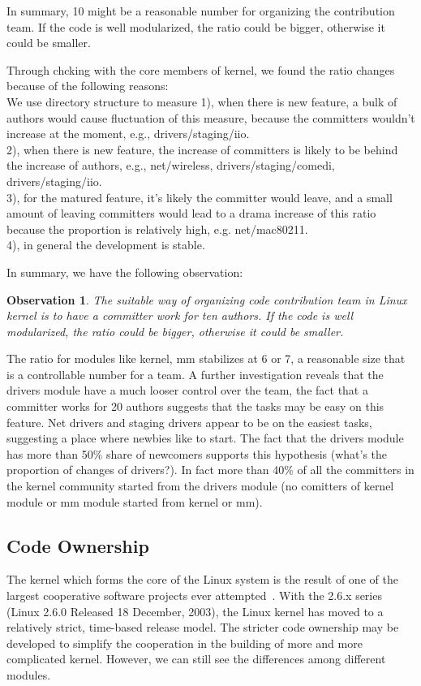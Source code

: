 \documentclass{sig-alternate-05-2015}
\newtheorem{observation}{\bf Observation}
\begin{document}
In summary, 10 might be a reasonable number for organizing the contribution
team. If the code is well modularized, the ratio could be bigger, otherwise
it could be smaller.

Through chcking with the core members of kernel, we found the ratio changes because of the following reasons: \\
We use directory structure to measure 
1), when there is new feature, a bulk of authors would cause fluctuation of this measure,
because the committers wouldn't increase at the moment, e.g., drivers/staging/iio. \\
2), when there is new feature, the increase of committers is likely to be behind
the increase of authors, e.g., net/wireless, drivers/staging/comedi, drivers/staging/iio.  \\
3), for the matured feature, it's likely the committer would leave, and a small amount
of leaving committers would lead to a drama increase of this ratio because the proportion
is relatively high, e.g. net/mac80211. \\
4), in general the development is stable.

In summary, we have the following observation:
\begin{observation}\label{o:1}
 The suitable way of organizing code contribution team in Linux kernel is
to have a committer work for ten authors. If the code is well modularized, 
the ratio could be bigger, otherwise it could be smaller.
\end{observation}

The ratio for modules like kernel, mm stabilizes at 6 or 7, a reasonable %
size that is a controllable number for a team.
A further investigation reveals that the drivers module have a much looser control over
the team, the fact that a committer works for 20 authors suggests that the tasks 
may be easy on this feature. Net drivers and staging drivers appear to be on
the easiest tasks, suggesting a place where newbies like to start. The fact
that the drivers module has more than 50\% share of newcomers supports this
hypothesis (what's the proportion of changes of drivers?).
In fact more than 40\% of all the committers in the kernel community
started from the drivers module (no comitters of kernel module or mm module started from kernel or mm).

\subsection{Code Ownership}
 The kernel which forms the core of the Linux system is the result 
of one of the largest cooperative software
projects ever attempted~\cite{kerneldvp}.
With the 2.6.x series (Linux 2.6.0 Released 18 December, 2003), the Linux kernel has moved to a relatively 
strict,  time-based  release  model. 
The stricter code ownership may be developed to simplify the cooperation
in the building of more and more complicated kernel.
However, we can still see the differences among different modules.
\end{document}
